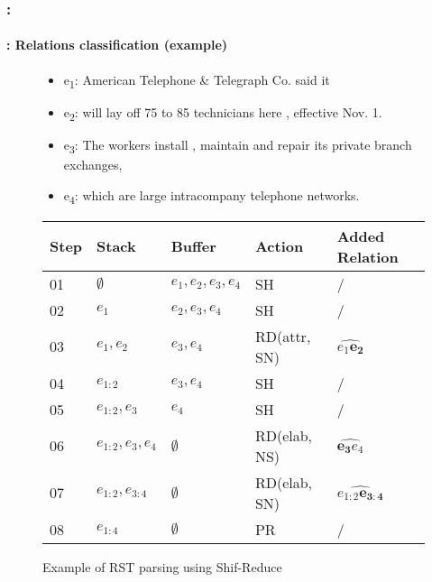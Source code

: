 \documentclass[xcolor=table]{beamer}
\begin{document}
\begin{frame}
	\frametitle{\insertshortsubtitle: \insertsection}
	\framesubtitle{\insertsubsection: Relations classification (example)}
	
	\begin{figure}
		\begin{minipage}{0.25\textwidth}
		\end{minipage}
		\begin{minipage}{0.70\textwidth}
			\scriptsize
			\begin{itemize}
				\item e\textsubscript{1}: American Telephone \& Telegraph Co. said it
				\item e\textsubscript{2}: will lay off 75 to 85 technicians here , effective Nov. 1.
				\item e\textsubscript{3}: The workers install , maintain and repair its private branch exchanges,
				\item e\textsubscript{4}: which are large intracompany telephone networks.
			\end{itemize}
		\end{minipage}
		
		\small
		\begin{tabular}{lllll}
			\hline\hline 
			Step & Stack & Buffer & Action & Added Relation \\
			\hline
			01 & $\emptyset$ & $e_1, e_2, e_3, e_4$ & SH & / \\
			02 & $e_1$ & $e_2, e_3, e_4$ & SH & / \\
			03 & $e_1, e_2$ & $e_3, e_4$ & RD(attr, SN) & $\widehat{e_1 \mathbf{e_2}}$ \\
			04 & $e_{1:2}$ & $e_3, e_4$ & SH & / \\
			05 & $e_{1:2}, e_3$ & $e_4$ & SH & / \\
			06 & $e_{1:2}, e_3, e_4$ & $\emptyset$ & RD(elab, NS) & $\widehat{\mathbf{e_3} e_4}$ \\
			07 & $e_{1:2}, e_{3:4}$ & $\emptyset$ & RD(elab, SN) & $\widehat{e_{1:2}\mathbf{e_{3:4}}}$ \\
			08 & $e_{1:4}$ & $\emptyset$ & PR & / \\
			\hline\hline
		\end{tabular}
		\caption{Example of RST parsing using Shif-Reduce \cite{2018-yu-al}}
	\end{figure}
	
\end{frame}
\end{document}
